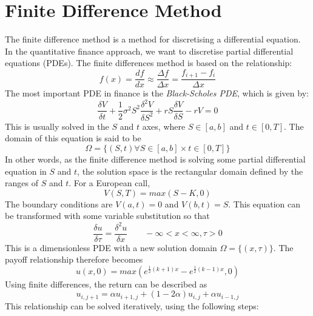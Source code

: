 \section{Finite Difference Method}

The finite difference method is a method for discretising a differential equation.\cite{advancedquantcpp} In the quantitative finance approach, we want to discretise partial differential equations (PDEs). The finite differences method is based on the relationship:
\begin{equation}
f(x) = \frac{df}{dx} \approx \frac{\Delta f}{\Delta x} = \frac{f_{i+1}-f_i}{\Delta x}
\end{equation}
The most important PDE in finance is the {\em Black-Scholes PDE}, which is given by:
\begin{equation}
\frac{\delta V}{\delta t} + \frac{1}{2}\sigma^2S^2\frac{\delta^2V}{\delta S^2}+rS\frac{\delta V}{\delta S}-rV=0
\label{eq:blackscholeseq}
\end{equation}
This is usually solved in the $S$ and $t$ axes, where $S\in [a,b]$ and $t\in [0,T]$. The domain of this equation is said to be 
\begin{equation}
\Omega=\{(S,t)\forall S\in [a,b]\times t\in [0,T]\}
\end{equation}
In other words, as the finite difference method is solving some partial differential equation in $S$ and $t$, the solution space is the rectangular domain defined by the ranges of $S$ and $t$. For a European call, 
\begin{equation}
	V(S,T) = max(S-K,0)
\end{equation}
The boundary conditions are $V(a,t)=0$ and $V(b,t)=S$. This equation can be transformed with some variable substitution so that 
\begin{equation}
\frac{\delta u}{\delta\tau}=\frac{\delta^2 u}{\delta x}\qquad -\infty<x<\infty, \tau>0
\end{equation}
This is a dimensionless PDE with a new solution domain $\Omega=\{(x,\tau)\}$. The payoff relationship therefore becomes
\begin{equation}
u(x,0) = max(e^{\frac{1}{2}(k+1)x}-e^{\frac{1}{2}(k-1)x},0)
\end{equation}
Using finite differences, the return can be described as
\begin{equation}
u_{i,j+1}=\alpha u_{i+1,j}+(1-2\alpha)u_{i,j}+\alpha u_{i-1,j}
\end{equation}
This relationship can be solved iteratively, using the following steps:


